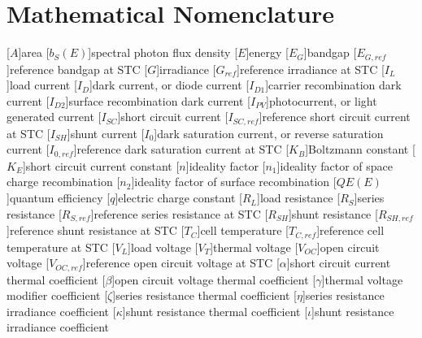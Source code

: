 \chapter{Mathematical Nomenclature}\label{appendix:math_nomenclature}

\begin{acronym}
    [$A$]{area}
    [$b_S(E)$]{spectral photon flux density}
    [$E$]{energy}
    [$E_G$]{bandgap}
    [$E_{G,ref}$]{reference bandgap at STC}
    [$G$]{irradiance}
    [$G_{ref}$]{reference irradiance at STC}
    [$I_L$]{load current}
    [$I_D$]{dark current, or diode current}
    [$I_{D1}$]{carrier recombination dark current}
    [$I_{D2}$]{surface recombination dark current}
    [$I_{PV}$]{photocurrent, or light generated current}
    [$I_{SC}$]{short circuit current}
    [$I_{SC,ref}$]{reference short circuit current at STC}
    [$I_{SH}$]{shunt current}
    [$I_0$]{dark saturation current, or reverse saturation current}
    [$I_{0,ref}$]{reference dark saturation current at STC}
    [$K_B$]{Boltzmann constant}
    [$K_E$]{short circuit current constant}
    [$n$]{ideality factor}
    [$n_1$]{ideality factor of space charge recombination}
    [$n_2$]{ideality factor of surface recombination}
    [$QE(E)$]{quantum efficiency}
    [$q$]{electric charge constant}
    [$R_L$]{load resistance}
    [$R_S$]{series resistance}
    [$R_{S,ref}$]{reference series resistance at STC}
    [$R_{SH}$]{shunt resistance}
    [$R_{SH,ref}$]{reference shunt resistance at STC}
    [$T_C$]{cell temperature}
    [$T_{C,ref}$]{reference cell temperature at STC}
    [$V_L$]{load voltage}
    [$V_T$]{thermal voltage}
    [$V_{OC}$]{open circuit voltage}
    [$V_{OC,ref}$]{reference open circuit voltage at STC}
    [$\alpha$]{short circuit current thermal coefficient}
    [$\beta$]{open circuit voltage thermal coefficient}
    [$\gamma$]{thermal voltage modifier coefficient}
    [$\zeta$]{series resistance thermal coefficient}
    [$\eta$]{series resistance irradiance coefficient}
    [$\kappa$]{shunt resistance thermal coefficient}
    [$\iota$]{shunt resistance irradiance coefficient}
\end{acronym}